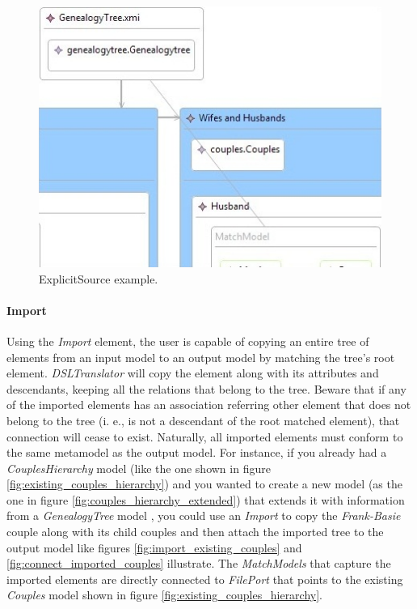 \begin{figure}[h]
\begin{center}
  \includegraphics[scale=0.7]{imgs/explicit_source_example.jpg}
  \caption{ExplicitSource example.}
  \label{fig:explicit_source_example}
\end{center}
\end{figure}






\paragraph{Import}

Using the \emph{Import} element, the user is capable of copying an entire tree
of elements from an input model to an output model by matching the tree's root
element. \emph{DSLTranslator} will copy the element along with its attributes
and descendants, keeping all the relations that belong to the tree. Beware that
if any of the imported elements has an association referring other element that
does not belong to the tree (i. e., is not a descendant of the root
matched element), that connection will cease to exist.
Naturally, all imported elements must conform to the same metamodel as the
output model. For instance, if you already had a \emph{CouplesHierarchy} model
(like the one shown in figure \ref{fig:existing_couples_hierarchy}) and you
wanted to create a new model (as the one in figure
\ref{fig:couples_hierarchy_extended}) that extends it with information from a
\emph{GenealogyTree} model , you could use an \emph{Import} to copy the
\emph{Frank-Basie} couple along with its child couples and then attach the
imported tree to the output model like figures \ref{fig:import_existing_couples}
and \ref{fig:connect_imported_couples} illustrate. The \emph{MatchModels} that
capture the imported elements are directly connected to \emph{FilePort} that
points to the existing \emph{Couples} model shown in figure
\ref{fig:existing_couples_hierarchy}.

